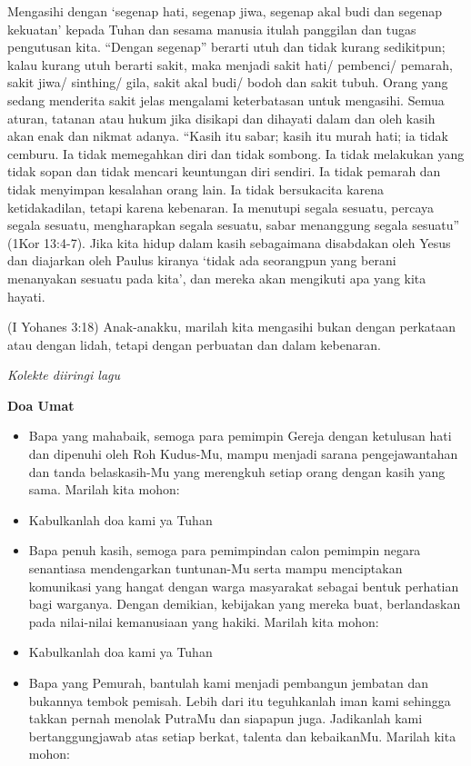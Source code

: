 \documentclass[a4paper,12pt]{scrartcl}
\makeatletter
\newcommand{\subjudul}[1]{%
  {\parindent \z@ 
    \interlinepenalty\@M \bfseries #1\par\nobreak \vskip 10\p@ }}
\newcommand{\lagu}[1]{%
  {\parindent \z@ 
    \interlinepenalty\@M \slshape \mdseries \Large \textsl{#1}\par\nobreak \vskip 20\p@ }}
\newcommand{\BU}[1]{\begin{itemize} \item[U:] #1 \end{itemize}}
\newcommand{\BP}[1]{\begin{itemize} \item[P:] #1 \end{itemize}}
\makeatother
\begin{document}
Mengasihi dengan ‘segenap hati, segenap jiwa, segenap akal budi dan segenap kekuatan’  kepada Tuhan dan sesama manusia itulah panggilan dan tugas pengutusan kita. “Dengan segenap”  berarti utuh dan tidak kurang sedikitpun; kalau kurang utuh berarti sakit, maka menjadi sakit hati/ pembenci/ pemarah, sakit jiwa/ sinthing/ gila, sakit akal budi/ bodoh dan sakit tubuh. Orang yang sedang menderita sakit jelas mengalami keterbatasan untuk mengasihi. Semua aturan, tatanan atau hukum jika disikapi dan dihayati dalam dan oleh kasih akan enak dan nikmat adanya. “Kasih itu sabar; kasih itu murah hati; ia tidak cemburu. Ia tidak memegahkan diri dan tidak sombong. Ia tidak melakukan yang tidak sopan dan tidak mencari keuntungan diri sendiri. Ia tidak pemarah dan tidak menyimpan kesalahan orang lain. Ia tidak bersukacita karena ketidakadilan, tetapi karena kebenaran. Ia menutupi segala sesuatu, percaya segala sesuatu, mengharapkan segala sesuatu, sabar menanggung segala sesuatu” (1Kor 13:4-7). Jika kita hidup dalam kasih sebagaimana disabdakan oleh Yesus dan diajarkan oleh Paulus kiranya ‘tidak ada seorangpun yang berani menanyakan sesuatu pada kita’, dan mereka akan mengikuti apa yang kita hayati.

(I Yohanes 3:18) Anak-anakku, marilah kita mengasihi bukan dengan perkataan atau dengan lidah,
tetapi dengan perbuatan dan dalam kebenaran.

\lagu{Kolekte diiringi lagu}

\subjudul{Doa Umat}

\BP{Bapa yang mahabaik, semoga para pemimpin Gereja dengan ketulusan hati dan
dipenuhi oleh Roh Kudus-Mu, mampu menjadi sarana pengejawantahan dan tanda
belaskasih-Mu yang merengkuh setiap orang dengan kasih yang sama. 
Marilah kita mohon:}

\BU{Kabulkanlah doa kami ya Tuhan}
\BP{Bapa penuh kasih, semoga para pemimpindan calon pemimpin negara senantiasa
mendengarkan tuntunan-Mu serta mampu menciptakan komunikasi yang hangat dengan warga
masyarakat sebagai bentuk perhatian bagi warganya. Dengan demikian, kebijakan yang
mereka buat, berlandaskan pada nilai-nilai kemanusiaan yang hakiki. 
 Marilah kita mohon:}

\BU{Kabulkanlah doa kami ya Tuhan}


\BP{Bapa yang Pemurah, bantulah kami menjadi pembangun jembatan dan bukannya
tembok pemisah. Lebih dari itu teguhkanlah iman kami sehingga takkan pernah menolak
PutraMu dan siapapun juga. Jadikanlah kami
bertanggungjawab atas setiap berkat, talenta dan kebaikanMu.
Marilah kita mohon:}
\end{document}
